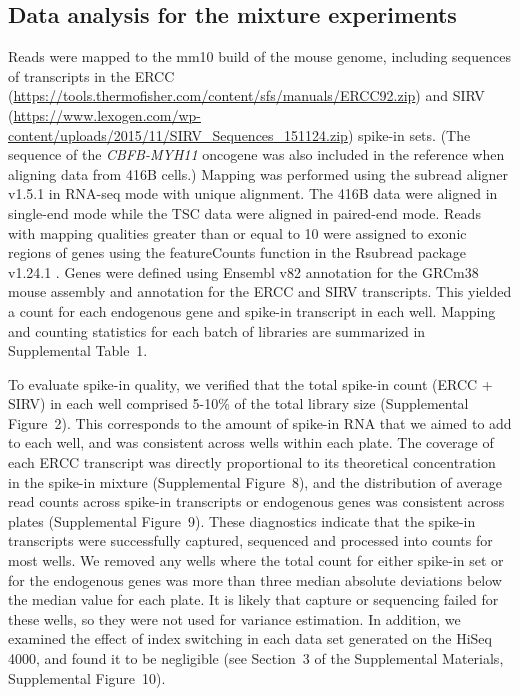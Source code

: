 \documentclass{article}
\newcommand{\suppfigtotals}{2}
\newcommand{\suppfigspikeconc}{8}
\newcommand{\suppfigspikeave}{9}
\newcommand{\suppfigindex}{10}
\newcommand{\suppsecindex}{3}
\newcommand{\supptabstats}{1}
\begin{document}
\subsection*{Data analysis for the mixture experiments}
Reads were mapped to the mm10 build of the mouse genome, including sequences of transcripts in the ERCC (\url{https://tools.thermofisher.com/content/sfs/manuals/ERCC92.zip}) and SIRV (\url{https://www.lexogen.com/wp-content/uploads/2015/11/SIRV_Sequences_151124.zip}) spike-in sets.
(The sequence of the \textit{CBFB-MYH11} oncogene was also included in the reference when aligning data from 416B cells.)
Mapping was performed using the subread aligner v1.5.1 \autocite{liao2013subread} in RNA-seq mode with unique alignment.
The 416B data were aligned in single-end mode while the TSC data were aligned in paired-end mode.
Reads with mapping qualities greater than or equal to 10 were assigned to exonic regions of genes using the featureCounts function in the Rsubread package v1.24.1 \autocite{liao2014featurecounts}.
Genes were defined using Ensembl v82 annotation for the GRCm38 mouse assembly and annotation for the ERCC and SIRV transcripts.
This yielded a count for each endogenous gene and spike-in transcript in each well.
Mapping and counting statistics for each batch of libraries are summarized in Supplemental Table~\supptabstats{}.

To evaluate spike-in quality, we verified that the total spike-in count (ERCC + SIRV) in each well comprised 5-10\% of the total library size (Supplemental Figure~\suppfigtotals{}).
This corresponds to the amount of spike-in RNA that we aimed to add to each well, and was consistent across wells within each plate.
The coverage of each ERCC transcript was directly proportional to its theoretical concentration in the spike-in mixture (Supplemental Figure~\suppfigspikeconc{}),
and the distribution of average read counts across spike-in transcripts or endogenous genes was consistent across plates (Supplemental Figure~\suppfigspikeave{}).
These diagnostics indicate that the spike-in transcripts were successfully captured, sequenced and processed into counts for most wells.
We removed any wells where the total count for either spike-in set or for the endogenous genes was more than three median absolute deviations below the median value for each plate. 
It is likely that capture or sequencing failed for these wells, so they were not used for variance estimation.
In addition, we examined the effect of index switching \autocite{sinha2017index} in each data set generated on the HiSeq 4000, and found it to be negligible (see Section~\suppsecindex{} of the Supplemental Materials, Supplemental Figure~\suppfigindex{}).
\end{document}
